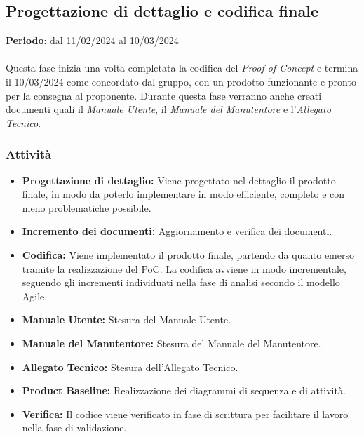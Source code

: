 
\subsection{Progettazione di dettaglio e codifica finale}\label{sec:pianificazione:progCodifica}

\textbf{Periodo}: dal 11/02/2024 al 10/03/2024\\\\
Questa fase inizia una volta completata la codifica del \textit{Proof of Concept} e termina il 10/03/2024 come concordato dal gruppo, con un prodotto funzionante e pronto per la consegna al proponente. Durante questa fase verranno anche creati documenti quali il \textit{Manuale Utente}, il \textit{Manuale del Manutentore} e l'\textit{Allegato Tecnico}.


\subsubsection{Attività}\label{sec:pianificazione:prog_codifica:attivita}
\begin{itemize}
    \item \textbf{Progettazione di dettaglio:} Viene progettato nel dettaglio il prodotto finale, in modo da poterlo implementare in modo efficiente, completo e con meno problematiche possibile. 
    \item \textbf{Incremento dei documenti:} Aggiornamento e verifica dei documenti.
    \item \textbf{Codifica:} Viene implementato il prodotto finale, partendo da quanto emerso tramite la realizzazione del PoC. La codifica avviene in modo incrementale, seguendo gli incrementi individuati nella fase di analisi secondo il modello Agile.
    \item \textbf{Manuale Utente:} Stesura del Manuale Utente.
    \item \textbf{Manuale del Manutentore:} Stesura del Manuale del Manutentore.
    \item \textbf{Allegato Tecnico:} Stesura dell'Allegato Tecnico.
    \item \textbf{Product Baseline:} Realizzazione dei diagrammi di sequenza e di attività.
    \item \textbf{Verifica:} Il codice viene verificato in fase di scrittura per facilitare il lavoro nella fase di validazione.
\end{itemize}

